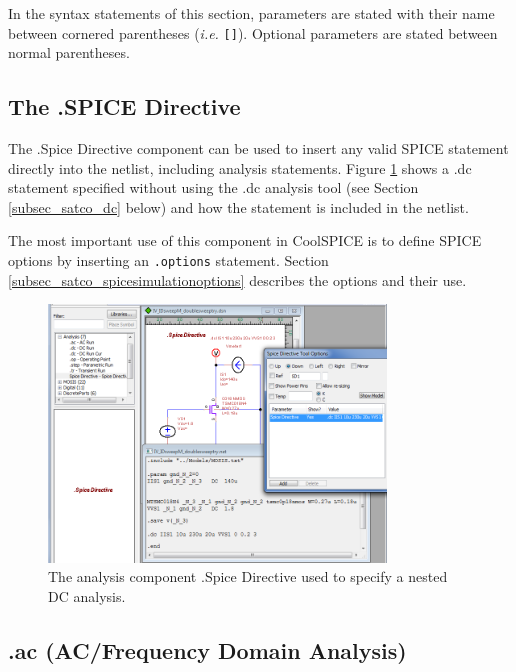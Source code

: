 In the syntax statements of this section, parameters are stated with their name between cornered parentheses (\textit{i.e.} \texttt{[]}).  Optional parameters are stated between normal parentheses. 

\subsection{The .SPICE Directive}
\label{sec_satco_thespicedirective}
The \textsf{.Spice Directive} component can be used to insert any valid SPICE statement directly into the netlist, including analysis statements.  Figure \ref{fig_spiceanalysis_spicedirectiveexample} shows a \textsf{.dc} statement specified without using the \textsf{.dc} analysis tool (see Section \ref{subsec_satco_dc} below) and how the statement is included in the netlist.

The most important use of this component in CoolSPICE is to define SPICE options by inserting an \texttt{.options} statement.  Section \ref{subsec_satco_spicesimulationoptions} describes the options and their use.

\begin{figure}[b]
  \centering
    \includegraphics[width=0.8\textwidth]{./figures/spice_analysis_figures/SPICEAnalysis_spicedirective1.png}
    \caption{The analysis component \textsf{.Spice Directive} used to specify a nested DC analysis.}
  \label{fig_spiceanalysis_spicedirectiveexample}
\end{figure} 


\clearpage

\subsection{.ac (AC/Frequency Domain Analysis)}
\label{subsec_satco_ac}

